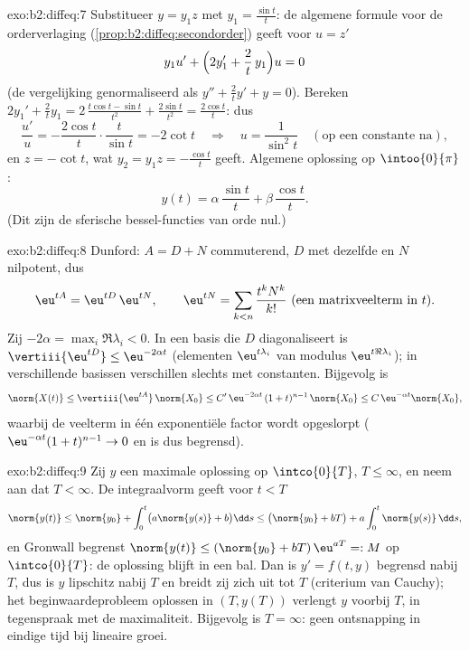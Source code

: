 \begin{solution}{exo:b2:diffeq:7}
Substitueer $y = y_1 z$ met $y_1 = \frac{\sin t}{t}$: de algemene
formule voor de orderverlaging
(\cref{prop:b2:diffeq:secondorder}) geeft voor $u = z'$
\[
y_1 u' + \Bigl(2y_1' + \frac{2}{t}\,y_1\Bigr)u = 0
\]
(de vergelijking genormaliseerd als $y'' + \frac2t y' + y = 0$).
Bereken $2y_1' + \frac2t y_1 = 2\,\frac{t\cos t - \sin t}{t^2} +
\frac{2\sin t}{t^2} = \frac{2\cos t}{t}$: dus
\[
\frac{u'}{u} = -\frac{2\cos t}{t}\cdot\frac{t}{\sin t}
= -2\cot t
\quad\Longrightarrow\quad
u = \frac{1}{\sin^2 t}
\quad (\text{op een constante na}),
\]
en $z = -\cot t$, wat $y_2 = y_1 z = -\frac{\cos t}{t}$ geeft.
Algemene oplossing op $\intoo{0}{\pi}$:
\[
y(t) = \alpha\,\frac{\sin t}{t} + \beta\,\frac{\cos t}{t} .
\]
(Dit zijn de sferische bessel-functies van orde nul.)
\end{solution}

\begin{solution}{exo:b2:diffeq:8}
Dunford: $A = D + N$ commuterend, $D$  met
dezelfde  en $N$ nilpotent, dus
\[
\eu^{tA} = \eu^{tD}\,\eu^{tN},
\qquad
\eu^{tN} = \sum_{k < n} \frac{t^kN^k}{k!}
\ \text{(een matrixveelterm in } t).
\]
Zij $-2\alpha = \max_i \Re\lambda_i < 0$. In een basis die $D$
diagonaliseert is $\vertiii{\eu^{tD}} \leq \eu^{-2\alpha t}$
(elementen $\eu^{t\lambda_i}$ van modulus $\eu^{t\Re\lambda_i}$);
 in verschillende basissen verschillen slechts met
constanten. Bijgevolg is
\[
\norm{X(t)} \leq \vertiii{\eu^{tA}}\,\norm{X_0}
\leq C'\,\eu^{-2\alpha t}\,(1 + t)^{n-1}\,\norm{X_0}
\leq C\,\eu^{-\alpha t}\norm{X_0} ,
\]
waarbij de veelterm in één exponentiële factor wordt opgeslorpt
($\eu^{-\alpha t}(1+t)^{n-1} \to 0$ en is dus begrensd).
\end{solution}

\begin{solution}{exo:b2:diffeq:9}
Zij $y$ een maximale oplossing op $\intco{0}{T}$, $T \leq \infty$,
en neem aan dat $T < \infty$. De integraalvorm geeft voor $t < T$
\[
\norm{y(t)} \leq \norm{y_0} + \int_0^t \bigl(a\norm{y(s)} +
b\bigr)\dd s
\leq \bigl(\norm{y_0} + bT\bigr) + a\int_0^t\norm{y(s)}\,\dd s ,
\]
en Gronwall begrenst $\norm{y(t)} \leq (\norm{y_0} +
bT)\,\eu^{aT} =: M$ op $\intco{0}{T}$: de oplossing blijft in een
 bal. Dan is $y' = f(t, y)$ begrensd nabij $T$, dus is $y$
lipschitz nabij $T$ en breidt zij zich  uit tot $T$
(criterium van Cauchy); het beginwaardeprobleem oplossen in $(T,
y(T))$ verlengt $y$ voorbij $T$, in tegenspraak met de
maximaliteit. Bijgevolg is $T = \infty$: geen ontsnapping in
eindige tijd bij lineaire groei.
\end{solution}

